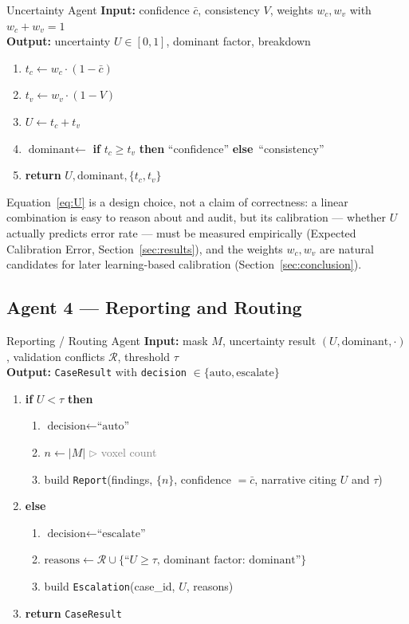 \documentclass[11pt,a4paper]{article}
\newenvironment{algosteps}{\begin{enumerate}[label=\arabic*:, leftmargin=2.1em, itemsep=1pt, topsep=2pt]}{\end{enumerate}}
\newcommand{\algoreturn}[1]{\textbf{return} #1}
\newcommand{\algoif}[1]{\textbf{if} #1 \textbf{then}}
\newcommand{\algoelse}{\textbf{else}}
\newcommand{\algocomment}[1]{\hfill\textcolor{gray}{\footnotesize $\triangleright$ #1}}
\begin{document}
\begin{algobox}{Uncertainty Agent}
\textbf{Input:} confidence $\bar c$, consistency $V$, weights $w_c, w_v$ with $w_c+w_v=1$ \\
\textbf{Output:} uncertainty $U \in [0,1]$, dominant factor, breakdown
\begin{algosteps}
\item $t_c \gets w_c \cdot (1-\bar c)$
\item $t_v \gets w_v \cdot (1-V)$
\item $U \gets t_c + t_v$
\item $\text{dominant} \gets$ \algoif{$t_c \geq t_v$} ``confidence'' \algoelse\ ``consistency''
\item \algoreturn{$U, \text{dominant}, \{t_c, t_v\}$}
\end{algosteps}
\end{algobox}

\begin{keytakeaway}
Equation~\ref{eq:U} is a design choice, not a claim of correctness: a linear combination is easy to reason about and audit, but its calibration --- whether $U$ actually predicts error rate --- must be measured empirically (Expected Calibration Error, Section~\ref{sec:results}), and the weights $w_c, w_v$ are natural candidates for later learning-based calibration (Section~\ref{sec:conclusion}).
\end{keytakeaway}

\subsection{Agent 4 --- Reporting and Routing}
\begin{algobox}{Reporting / Routing Agent}
\textbf{Input:} mask $M$, uncertainty result $(U,\text{dominant},\cdot)$, validation conflicts $\mathcal{R}$, threshold $\tau$ \\
\textbf{Output:} \texttt{CaseResult} with \texttt{decision} $\in \{\text{auto}, \text{escalate}\}$
\begin{algosteps}
\item \algoif{$U < \tau$}
\begin{algosteps}
\item $\text{decision} \gets \text{``auto''}$
\item $n \gets |M|$ \algocomment{voxel count}
\item build \texttt{Report}(findings, $\{n\}$, confidence $=\bar c$, narrative citing $U$ and $\tau$)
\end{algosteps}
\item \algoelse
\begin{algosteps}
\item $\text{decision} \gets \text{``escalate''}$
\item $\text{reasons} \gets \mathcal{R} \cup \{\text{``}U \ge \tau\text{, dominant factor: dominant''}\}$
\item build \texttt{Escalation}(case\_id, $U$, reasons)
\end{algosteps}
\item \algoreturn{\texttt{CaseResult}}
\end{algosteps}
\end{algobox}
\end{document}
